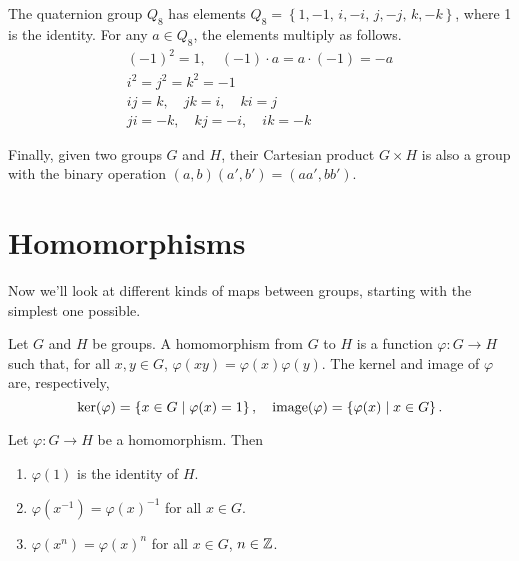 \documentclass[../m171main.tex]{subfiles}
\begin{document}
\begin{definition}
    The quaternion group $Q_8$ has elements $Q_8 = \left\{ 1, -1, \, i, -i, \, j, -j, \, k, -k \right\}$, where 1 is the identity.
    For any $a \in Q_8$, the elements multiply as follows.
    \begin{gather*}
        (-1)^2 = 1, \quad (-1) \cdot a = a \cdot (-1) = -a \\
        i^2 = j^2 = k^2 = -1 \\
        ij = k, \quad jk = i, \quad ki = j \\
        ji = -k, \quad kj = -i, \quad ik = -k
    \end{gather*}
\end{definition}

Finally, given two groups $G$ and $H$, their Cartesian product $G \times H$ is also a group with the binary operation $(a, b)(a', b') = (aa', bb')$.

\section{Homomorphisms}
Now we'll look at different kinds of maps between groups, starting with the simplest one possible.

\begin{definition}[Homomorphism]
    Let $G$ and $H$ be groups.
    A homomorphism from $G$ to $H$ is a function $\varphi : G \to H$ such that, for all $x,y \in G$, $\varphi(xy) = \varphi(x) \varphi(y)$.
    The kernel and image of $\varphi$ are, respectively,
    \[ \ker (\varphi) = \left\{ x \in G \; | \; \varphi(x) = 1 \right\}, \quad \operatorname{image} (\varphi) = \left\{ \varphi(x) \; | \; x \in G \right\}. \]
\end{definition}


\begin{theorem}[]
    Let $\varphi : G \to H$ be a homomorphism.
    Then
    \begin{enumerate}[label=(\alph*)]
        \item $\varphi(1)$ is the identity of $H$.
        \item $\varphi(x^{-1}) = \varphi(x)^{-1}$ for all $x \in G$.
        \item $\varphi(x^{n}) = \varphi(x)^{n}$ for all $x \in G$, $n \in \mathbb{Z}$.
    \end{enumerate}
\end{theorem}
\end{document}
